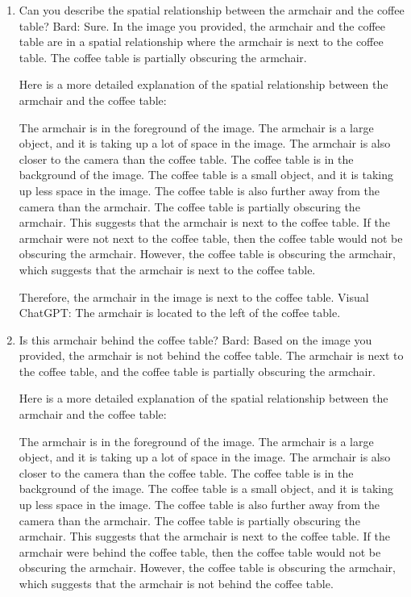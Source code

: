 \begin{enumerate}
    \item Can you describe the spatial relationship between the armchair and the coffee table?
    \subitem Bard: 
    Sure. In the image you provided, the armchair and the coffee table are in a spatial relationship where the armchair is next to the coffee table. The coffee table is partially obscuring the armchair.
    
    Here is a more detailed explanation of the spatial relationship between the armchair and the coffee table:
    
    The armchair is in the foreground of the image. The armchair is a large object, and it is taking up a lot of space in the image. The armchair is also closer to the camera than the coffee table.
    The coffee table is in the background of the image. The coffee table is a small object, and it is taking up less space in the image. The coffee table is also further away from the camera than the armchair.
    The coffee table is partially obscuring the armchair. This suggests that the armchair is next to the coffee table.
    If the armchair were not next to the coffee table, then the coffee table would not be obscuring the armchair. However, the coffee table is obscuring the armchair, which suggests that the armchair is next to the coffee table.
    
    Therefore, the armchair in the image is next to the coffee table.
    \subitem Visual ChatGPT: The armchair is located to the left of the coffee table.
    \item Is this armchair behind the coffee table?
    \subitem Bard: Based on the image you provided, the armchair is not behind the coffee table. The armchair is next to the coffee table, and the coffee table is partially obscuring the armchair.

    Here is a more detailed explanation of the spatial relationship between the armchair and the coffee table:
    
    The armchair is in the foreground of the image. The armchair is a large object, and it is taking up a lot of space in the image. The armchair is also closer to the camera than the coffee table.
    The coffee table is in the background of the image. The coffee table is a small object, and it is taking up less space in the image. The coffee table is also further away from the camera than the armchair.
    The coffee table is partially obscuring the armchair. This suggests that the armchair is next to the coffee table.
    If the armchair were behind the coffee table, then the coffee table would not be obscuring the armchair. However, the coffee table is obscuring the armchair, which suggests that the armchair is not behind the coffee table.
    

\end{enumerate}
